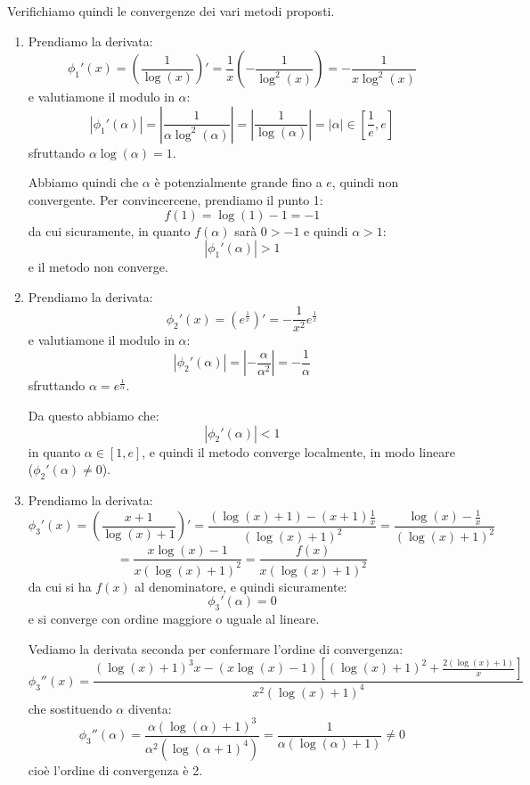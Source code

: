 \documentclass[a4paper,11pt]{article}
\begin{document}
Verifichiamo quindi le convergenze dei vari metodi proposti.
\begin{enumerate}
	\item Prendiamo la derivata:
		$$
		\phi_1'(x) = \left( \frac{1}{\log(x)} \right)' = \frac{1}{x} \left( - \frac{1}{\log^2(x)} \right) = - \frac{1}{x \log^2(x)}
		$$
		e valutiamone il modulo in $\alpha$:
		$$
		|\phi_1'(\alpha)| = \left| \frac{1}{\alpha \log^2(\alpha)} \right| = \left| \frac{1}{\log(\alpha)} \right| = |\alpha| \in \left[\frac{1}{e}, e\right]
		$$
		sfruttando $\alpha \log(\alpha) = 1$.

		Abbiamo quindi che $\alpha$ è potenzialmente grande fino a $e$, quindi non convergente.
		Per convincercene, prendiamo il punto 1:
		$$
		f(1) = \log(1) - 1 = -1
		$$
		da cui sicuramente, in quanto $f(\alpha)$ sarà $0 > -1$ e quindi $\alpha > 1$:
		$$
		|\phi_1'(\alpha)| > 1
		$$
		e il metodo non converge.

	\item Prendiamo la derivata:
		$$
		\phi_2'(x) = \left( e^{\frac{1}{x}} \right)' = -\frac{1}{x^2} e^{\frac{1}{x}} 
		$$
		e valutiamone il modulo in $\alpha$:
		$$
		|\phi_2'(\alpha)| = \left| -\frac{\alpha}{\alpha^2} \right| = -\frac{1}{\alpha}
		$$
		sfruttando $\alpha = e^{\frac{1}{\alpha}}$.
		
		Da questo abbiamo che:
		$$
		|\phi_2'(\alpha)| < 1
		$$
		in quanto $\alpha \in [1, e]$, e quindi il metodo converge localmente, in modo lineare ($\phi_2'(\alpha) \neq 0$).

	\item Prendiamo la derivata:
		$$
		\phi_3'(x) = \left( \frac{x + 1}{\log(x) + 1} \right)' = \frac{( \log(x) + 1) - (x + 1) \frac{1}{x}}{(\log(x) + 1)^2} = \frac{\log(x) - \frac{1}{x}}{(\log(x) + 1)^2}
		$$
		$$
		= \frac{x \log(x) - 1}{x (\log(x) + 1)^2} = \frac{f(x)}{x (\log(x) + 1)^2}
		$$
		da cui si ha $f(x)$ al denominatore, e quindi sicuramente:
		$$
		\phi_3'(\alpha) = 0
		$$
		e si converge con ordine maggiore o uguale al lineare.
		
		Vediamo la derivata seconda per confermare l'ordine di convergenza:
		$$
		\phi_3''(x) = \frac{ (\log(x) + 1)^3 x - (x \log(x) - 1) \left[ (\log(x) + 1)^2 + \frac{2(\log(x) + 1)}{x} \right] }{ x^2 (\log(x) + 1)^4 } 
		$$
		che sostituendo $\alpha$ diventa:
		$$
		\phi_3''(\alpha) = \frac{\alpha (\log(\alpha) + 1)^3}{\alpha^2 (\log(\alpha + 1)^4)} = \frac{1}{\alpha (\log(\alpha) + 1)} \neq 0
		$$
		cioè l'ordine di convergenza è 2.
\end{enumerate}
\end{document}
